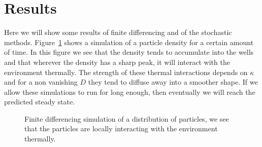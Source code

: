 \documentclass[11pt]{article} %
\begin{document}
\section{Results}
Here we will show some results of finite differencing and of the stochastic methods. Figure~\ref{fig:FiniteDifferences} shows a simulation of a particle density for a certain amount of time. In this figure we see that the density tends to accumulate into the wells and that wherever the density has a sharp peak, it will interact with the environment thermally. The strength of these thermal interactions depends on $\kappa$ and for a non vanishing $D$ they tend to diffuse away into a smoother shape. If we allow these simulations to run for long enough, then eventually we will reach the predicted steady state.

\begin{figure}[tb]
	\centering
\quad
\caption{Finite differencing simulation of a distribution of particles, we see that the particles are locally interacting with the environment thermally.}
\label{fig:FiniteDifferences}
\end{figure}
\end{document}
